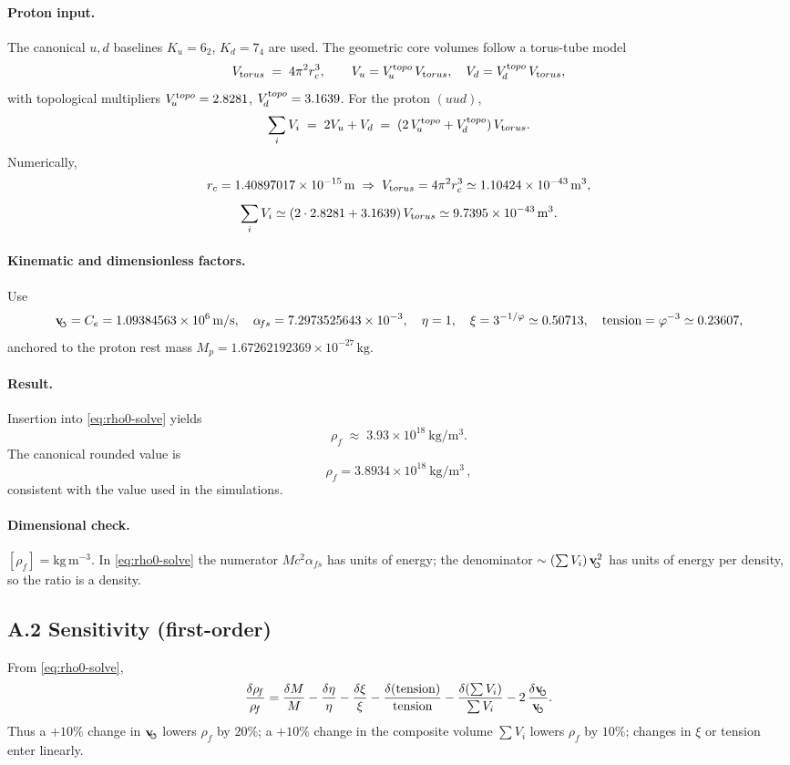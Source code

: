 \documentclass[11pt, preprint,titlepage]{revtex4-2}
\newcommand{\rhoF}{\rho_{\!f}}      %
\newcommand{\swirlarrow}{\!\!\scriptsize\boldsymbol{\circlearrowleft}}
\newcommand{\vswirl}{\mathbf{v}_{\swirlarrow}}
\begin{document}
	\paragraph{Proton input.}
	The canonical \(u,d\) baselines \(K_u=6_2\), \(K_d=7_4\) are used.
	The geometric core volumes follow a torus-tube model
	\[
		V_{\textrm torus} \;=\; 4\pi^2 r_c^3,\qquad
		V_u = V_{\!u}^{\textrm topo}\,V_{\textrm torus},\quad V_d = V_{\!d}^{\textrm topo}\,V_{\textrm torus},
	\]
	with topological multipliers
	\(V_{\!u}^{\textrm topo}=2.8281\), \(V_{\!d}^{\textrm topo}=3.1639\).
	For the proton \((uud)\),
	\[
		\sum_i V_i \;=\; 2V_u + V_d \;=\; (2\,V_{\!u}^{\textrm topo}+V_{\!d}^{\textrm topo})\,V_{\textrm torus}.
	\]
	Numerically,
	\[
		r_c = 1.40897017\times 10^{-15}\,\mathrm{m}
		\;\Rightarrow\;
		V_{\textrm torus} = 4\pi^2 r_c^3 \simeq 1.10424\times10^{-43}\,\mathrm{m^3},
	\]
	\[
		\sum_i V_i \simeq (2\cdot 2.8281 + 3.1639)\,V_{\textrm torus}
		\simeq 9.7395\times 10^{-43}\,\mathrm{m^3}.
	\]

	\paragraph{Kinematic and dimensionless factors.}
	Use
	\[
		\vswirl = C_e = 1.09384563\times10^6\,\mathrm{m/s},\quad
		\alpha_{\!fs}=7.2973525643\times10^{-3},\quad
		\eta=1,\quad \xi = 3^{-1/\varphi}\simeq 0.50713,\quad
		\text{tension} = \varphi^{-3} \simeq 0.23607,
	\]
	anchored to the proton rest mass \(M_p=1.67262192369\times10^{-27}\,\mathrm{kg}\).

	\paragraph{Result.}
	Insertion into \eqref{eq:rho0-solve} yields
	\[
		\rhoF \;\approx\; 3.93\times 10^{18}\ \mathrm{kg/m^3}.
	\]
	The canonical rounded value is
	\[
		\boxed{ \rhoF = 3.8934\times 10^{18}\ \mathrm{kg/m^3} }\,,
	\]
	consistent with the value used in the simulations.

	\paragraph{Dimensional check.}
	\([\rhoF]=\mathrm{kg\,m^{-3}}\).
	In \eqref{eq:rho0-solve} the numerator \(M c^2\alpha_{\!fs}\) has units of energy; the denominator
	\(\sim (\sum V_i)\,\vswirl^{2}\) has units of energy per density, so the ratio is a density.

	\subsection*{A.2 Sensitivity (first-order)}
	From \eqref{eq:rho0-solve},
	\[
		\frac{\delta\rhoF}{\rhoF}
		= \frac{\delta M}{M}
		- \frac{\delta\eta}{\eta}
		- \frac{\delta\xi}{\xi}
		- \frac{\delta(\text{tension})}{\text{tension}}
		- \frac{\delta(\sum V_i)}{\sum V_i}
		- 2\,\frac{\delta \vswirl}{\vswirl}.
	\]
	Thus a \(+10\%\) change in \(\vswirl\) lowers \(\rhoF\) by \(20\%\); a \(+10\%\) change in the composite volume \(\sum V_i\) lowers \(\rhoF\) by \(10\%\); changes in \(\xi\) or tension enter linearly.
\end{document}
